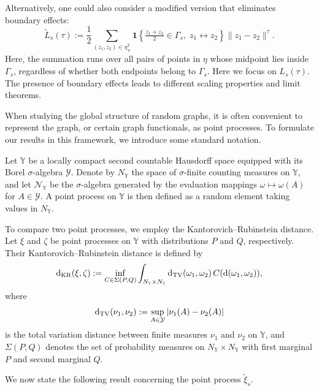 \documentclass{article}
\theoremstyle{definition}
\numberwithin{equation}{section}
\theoremstyle{remark}
\begin{document}
Alternatively, one could also consider a modified version that eliminates boundary effects:
\[
\widetilde{L}_s(\tau)
:= \frac{1}{2} \sum_{(z_1, z_2) \in \eta^2_{\neq}}
   \mathbf{1}\!\left\{
      \tfrac{z_1 + z_2}{2} \in \Gamma_s,\;
      z_1 \leftrightarrow z_2
   \right\}
   \| z_1 - z_2 \|^{\tau}.
\]
Here, the summation runs over all pairs of points in $\eta$ whose {midpoint}
lies inside $\Gamma_s$, regardless of whether both endpoints belong to $\Gamma_s$.
Here we focus on $L_s(\tau)$. The presence of boundary effects leads to different scaling properties and limit theorems.


When studying the global structure of random graphs, it is often convenient to represent the graph, or certain graph functionals, as point processes. To formulate our results in this framework, we introduce some standard notation.

Let $\mathbb{Y}$ be a locally compact second countable Hausdorff space equipped with its Borel $\sigma$-algebra $\mathcal{Y}$. Denote by $N_{\mathbb{Y}}$ the space of $\sigma$-finite counting measures on $\mathbb{Y}$, and let $\mathcal{N}_{\mathbb{Y}}$ be the $\sigma$-algebra generated by the evaluation mappings $\omega \mapsto \omega(A)$ for $A \in \mathcal{Y}$. A point process on $\mathbb{Y}$ is then defined as a random element taking values in $N_{\mathbb{Y}}$.

To compare two point processes, we employ the Kantorovich--Rubinstein distance. Let $\xi$ and $\zeta$ be point processes on $\mathbb{Y}$ with distributions $P$ and $Q$, respectively. Their Kantorovich--Rubinstein distance is defined by
\begin{equation}\label{def:KRdis}
\mathrm{d}_{\rm KR}(\xi,\zeta):=\inf_{C\in\Sigma(P,Q)}\int_{N_{\mathbb{Y}}\times N_{\mathbb{Y}}}\mathrm{d}_{\rm TV}(\omega_1,\omega_2)\, C(\mathrm{d}(\omega_1,\omega_2)),
\end{equation}
where
$$
\mathrm{d}_{\rm TV}(\nu_1,\nu_2)
:=
\sup_{A\in\mathcal{Y}} |\nu_1(A)-\nu_2(A)|
$$
is the total variation distance between finite measures $\nu_1$ and $\nu_2$ on $\mathbb{Y}$, and $\Sigma(P,Q)$ denotes the set of probability measures on $N_{\mathbb{Y}}\times N_{\mathbb{Y}}$ with first marginal $P$ and second marginal $Q$.

We now state the following result concerning the point process $\tilde{\xi}_s$.
\end{document}

